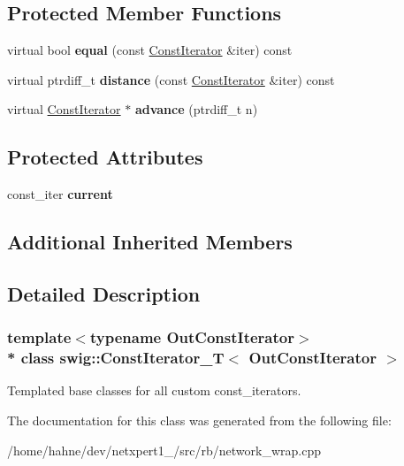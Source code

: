 \subsection*{Protected Member Functions}
\begin{DoxyCompactItemize}
\item 
virtual bool {\bfseries equal} (const \hyperlink{structswig_1_1ConstIterator}{Const\+Iterator} \&iter) const \hypertarget{classswig_1_1ConstIterator__T_a4cd710e2faa781eb7090e400705c9489}{}\label{classswig_1_1ConstIterator__T_a4cd710e2faa781eb7090e400705c9489}

\item 
virtual ptrdiff\+\_\+t {\bfseries distance} (const \hyperlink{structswig_1_1ConstIterator}{Const\+Iterator} \&iter) const \hypertarget{classswig_1_1ConstIterator__T_a659272b7634a80a842aefe1a2cff83a6}{}\label{classswig_1_1ConstIterator__T_a659272b7634a80a842aefe1a2cff83a6}

\item 
virtual \hyperlink{structswig_1_1ConstIterator}{Const\+Iterator} $\ast$ {\bfseries advance} (ptrdiff\+\_\+t n)\hypertarget{classswig_1_1ConstIterator__T_a8471c724f5c3e213c1b77353f12383ef}{}\label{classswig_1_1ConstIterator__T_a8471c724f5c3e213c1b77353f12383ef}

\end{DoxyCompactItemize}
\subsection*{Protected Attributes}
\begin{DoxyCompactItemize}
\item 
const\+\_\+iter {\bfseries current}\hypertarget{classswig_1_1ConstIterator__T_a4e8203ae72367af29c2909f73c234e92}{}\label{classswig_1_1ConstIterator__T_a4e8203ae72367af29c2909f73c234e92}

\end{DoxyCompactItemize}
\subsection*{Additional Inherited Members}


\subsection{Detailed Description}
\subsubsection*{template$<$typename Out\+Const\+Iterator$>$\\*
class swig\+::\+Const\+Iterator\+\_\+\+T$<$ Out\+Const\+Iterator $>$}

Templated base classes for all custom const\+\_\+iterators. 

The documentation for this class was generated from the following file\+:\begin{DoxyCompactItemize}
\item 
/home/hahne/dev/netxpert1\+\_/src/rb/network\+\_\+wrap.\+cpp\end{DoxyCompactItemize}
